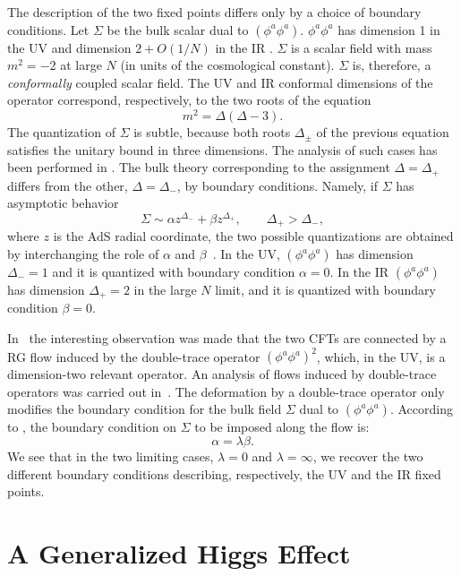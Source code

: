\documentclass[a4paper,12pt]{article}
\begin{document}
The description of the two fixed points differs only by a choice of
boundary conditions.  Let $\Sigma$ be the bulk scalar dual to
$(\phi^a\phi^a)$.  $\phi^a\phi^a$ has dimension 1 in the UV and
dimension $2+O(1/N)$ in the IR \cite{wilson}.  $\Sigma$ is a scalar
field with mass $m^2=-2$ at large $N$ (in units of the cosmological
constant). $\Sigma$ is, therefore, a {\it conformally} coupled scalar
field. The UV and IR conformal dimensions of the operator correspond,
respectively, to the two roots of the equation
\begin{equation}
m^2=\Delta (\Delta-3).
\end{equation}
The quantization of $\Sigma$ is subtle, because both roots
$\Delta_{\pm}$ of the previous equation satisfies the unitary bound
in three dimensions.  The analysis of such cases has been performed
in \cite{kw}. The bulk theory corresponding to the assignment
$\Delta=\Delta_+$ differs from the other, $\Delta=\Delta_-$, by 
boundary conditions. Namely, if $\Sigma$ has asymptotic
behavior
\begin{equation}
\Sigma\sim \alpha z^{\Delta_-} + \beta z^{\Delta_+}, \qquad 
\Delta_+>\Delta_-,
\end{equation}
where $z$ is the AdS radial coordinate, the two possible quantizations are
obtained by interchanging the role of $\alpha$ and $\beta$~\cite{kw}.
In the UV, $(\phi^a\phi^a)$ has dimension $\Delta_-=1$ and it is quantized
with boundary condition $\alpha=0$. In the IR $(\phi^a\phi^a)$ has
dimension $\Delta_+=2$ in the large $N$ limit, and it is quantized with
boundary condition $\beta=0$.

In~\cite{kp} the interesting observation was made that the two CFTs
are connected by a RG flow induced by the double-trace operator
$(\phi^a\phi^a)^2$, which, in the UV, is a dimension-two relevant
operator. An analysis of flows induced by double-trace operators was
carried out in~\cite{silverstein,wdouble,berkooz}. The deformation by
a double-trace operator only modifies the boundary condition for the
bulk field $\Sigma$ dual to $(\phi^a\phi^a)$.  According to
\cite{wdouble}, the boundary condition on $\Sigma$ to be imposed along
the flow is:
\begin{equation}
\alpha=\lambda \beta .
\label{flow}
\end{equation}
We see that in the two limiting cases, $\lambda=0$ and
$\lambda=\infty$, we recover the two different boundary conditions
describing, respectively, the UV and the IR fixed points.

\section{A Generalized Higgs Effect}
\end{document}
